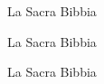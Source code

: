 \begin{thebibliography}{90}
La Sacra Bibbia

La Sacra Bibbia

La Sacra Bibbia
\end{thebibliography}
